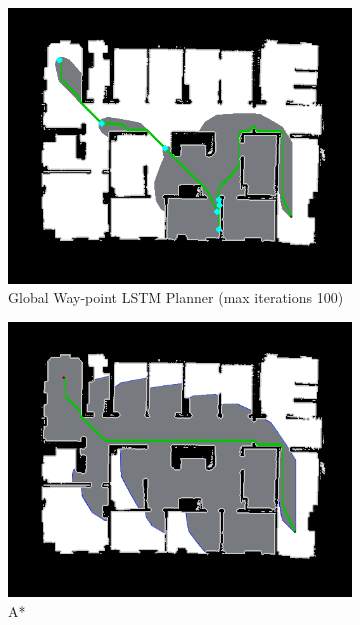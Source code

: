 \begin{figure}[]
  \begin{subfigure}[b]{0.40\linewidth}
    \includegraphics[width=\linewidth]{images/screenshot_148.png}
     \caption{Global Way-point LSTM Planner (max iterations 100)}
  \end{subfigure}
  \hfill
  \begin{subfigure}[b]{0.40\linewidth}
    \includegraphics[width=\linewidth]{images/screenshot_125.png}
     \caption{A*\newline}
  \end{subfigure}
  \hfill
  \begin{subfigure}[b]{0.40\linewidth}

\end{subfigure}
\end{figure}
